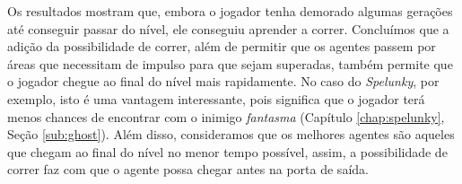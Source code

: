 Os resultados mostram que, embora o jogador tenha demorado algumas gerações até
conseguir passar do nível, ele conseguiu aprender a correr. Concluímos que a
adição da possibilidade de correr, além de permitir que os agentes passem por
áreas que necessitam de impulso para que sejam superadas, também permite que o
jogador chegue ao final do nível mais rapidamente. No caso do \textit{Spelunky},
por exemplo, isto é uma vantagem interessante, pois significa que o jogador terá
menos chances de encontrar com o inimigo \textit{fantasma} (Capítulo
\ref{chap:spelunky}, Seção \ref{sub:ghost}). Além disso, consideramos que os
melhores agentes são aqueles que chegam ao final do nível no menor tempo
possível, assim, a possibilidade de correr faz com que o agente possa chegar
antes na porta de saída.
